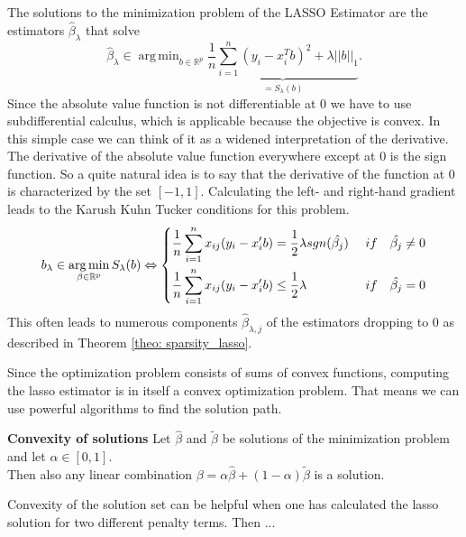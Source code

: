 \documentclass{article}
\theoremstyle{definition}
\DeclareMathOperator*{\argmin}{arg\,min}
\begin{document}
The solutions to the minimization problem of the LASSO Estimator are the estimators $\hat\beta_\lambda$ that solve
$$\hat\beta_\lambda \in \argmin_{b\in \mathbb{R}^p}\underbrace{\frac{1}{n}\sum_{i=1}^{n}(y_i-x_i^Tb)^2+\lambda||b||_1}_{=S_\lambda (b)}.$$
%
Since the absolute value function is not differentiable at 0 we have to use subdifferential calculus, which is applicable because the objective is convex. In this simple case we can think of it as a widened interpretation of the derivative. The derivative of the absolute value function everywhere except at 0 is the sign function. So a quite natural idea is to say that the derivative of the function at 0 is characterized by the set $[-1,1]$. Calculating the left- and right-hand gradient leads to the Karush Kuhn Tucker conditions for this problem. 
\begin{align*}
b_\lambda \in \argmin_{\beta \in\rm \mathbb{R}^p} S_\lambda(b) \Leftrightarrow \begin{dcases} 
\frac{1}{n}\sum_{i=1}^n x_{ij}(y_i-x_i'b)= \frac{1}{2}\lambda sgn(\hat{\beta_{j}}) &\ if \quad \hat{\beta_j} \neq0 \\   
\frac{1}{n}\sum_{i=1}^n x_{ij}(y_i-x_i'b) \leq  \frac{1}{2}\lambda \ &\ if \quad \hat{\beta_j} =0
\end{dcases} 
\end{align*}
This often leads to numerous components $\hat\beta_{\lambda,j}$ of the estimators dropping to 0 as described in Theorem \eqref{theo: sparsity_lasso}.


Since the optimization problem consists of sums of convex functions, computing the lasso estimator is in itself a convex optimization problem. That means we can use powerful algorithms to find the solution path. 

\textbf{Convexity of solutions} Let $\hat{\beta}$ and $\tilde{\beta}$ be solutions of the minimization problem and let $\alpha\in[0,1]$.\\
Then also any linear combination $\beta =\alpha \hat{\beta} + (1-\alpha) \tilde{\beta}$ is a solution. 

Convexity of the solution set can be helpful when one has calculated the lasso solution for two different penalty terms. Then ...
\end{document}
